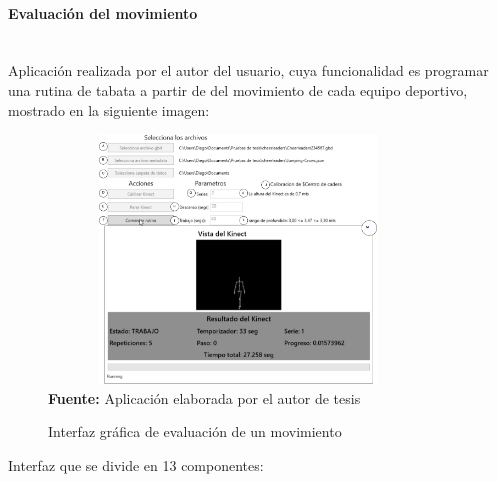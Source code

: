 \paragraph{Evaluaci\'on del movimiento}\mbox{} \\\label{ins:UI:wpf:evaluate}
Aplicaci\'on realizada por el autor del usuario, cuya funcionalidad es programar una rutina de tabata a partir de del movimiento de cada equipo deportivo, mostrado en la siguiente imagen:
\begin{figure}[H]
	\caption{Interfaz gr\'afica de evaluaci\'on de un movimiento}
	\label{fig:appEvaluate}
	\centering
	\includegraphics[width=380px,height=250px]{graphics/appEvaluacion.png} \\
	\textbf{Fuente:} Aplicaci\'on elaborada por el autor de tesis
\end{figure}
Interfaz que se divide en 13 componentes:
